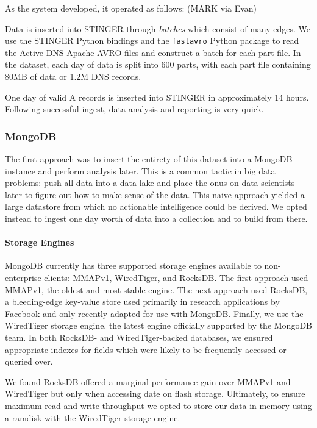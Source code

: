 \documentclass{acm_proc_article-sp}
\begin{document}
As the system developed, it operated as follows:
(MARK via Evan)

Data is inserted into STINGER through \textit{batches} which consist of many edges. We use the STINGER Python bindings and the \texttt{fastavro} Python package to read the Active DNS Apache AVRO files and construct a batch for each part file. In the dataset, each day of data is split into 600 parts, with each part file containing \ctilde 80MB of data or \ctilde 1.2M DNS records.

One day of valid A records is inserted into STINGER in approximately 14 hours. Following successful ingest, data analysis and reporting is very quick.


\subsubsection{MongoDB}
The first approach was to insert the entirety of this dataset into a MongoDB instance and perform analysis later. This is a common tactic in big data problems: push all data into a data lake and place the onus on data scientists later to figure out how to make sense of the data. This naive approach yielded a large datastore from which no actionable intelligence could be derived. We opted instead to ingest one day worth of data into a collection and to build from there. 

\paragraph{Storage Engines}
MongoDB currently has three supported storage engines available to non-enterprise clients: MMAPv1, WiredTiger, and RocksDB. The first approach used MMAPv1, the oldest and most-stable engine. The next approach used RocksDB, a bleeding-edge key-value store used primarily in research applications by Facebook and only recently adapted for use with MongoDB. Finally, we use the WiredTiger storage engine, the latest engine officially supported by the MongoDB team. In both RocksDB- and WiredTiger-backed databases, we ensured appropriate indexes for fields which were likely to be frequently accessed or queried over.

We found RocksDB offered a marginal performance gain over MMAPv1 and WiredTiger but only when accessing date on flash storage. Ultimately, to ensure maximum read and write throughput we opted to store our data in memory using a ramdisk with the WiredTiger storage engine.
\end{document}
